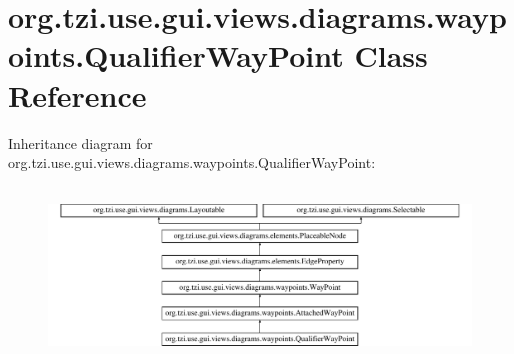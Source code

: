 \hypertarget{classorg_1_1tzi_1_1use_1_1gui_1_1views_1_1diagrams_1_1waypoints_1_1_qualifier_way_point}{\section{org.\-tzi.\-use.\-gui.\-views.\-diagrams.\-waypoints.\-Qualifier\-Way\-Point Class Reference}
\label{classorg_1_1tzi_1_1use_1_1gui_1_1views_1_1diagrams_1_1waypoints_1_1_qualifier_way_point}
}
Inheritance diagram for org.\-tzi.\-use.\-gui.\-views.\-diagrams.\-waypoints.\-Qualifier\-Way\-Point\-:\begin{figure}[H]
\begin{center}
\leavevmode
\includegraphics[height=4.692738cm]{classorg_1_1tzi_1_1use_1_1gui_1_1views_1_1diagrams_1_1waypoints_1_1_qualifier_way_point}
\end{center}
\end{figure}
